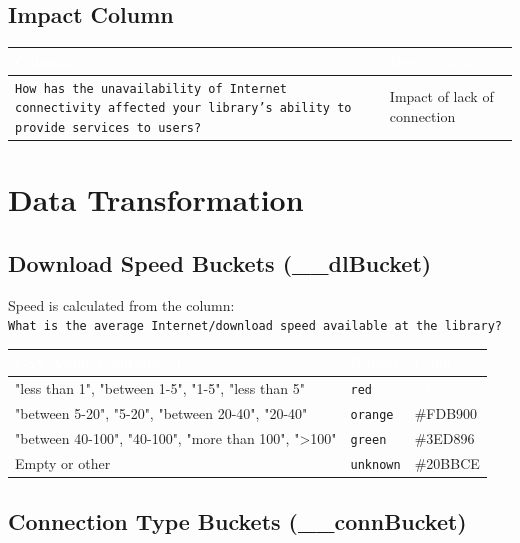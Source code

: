 \documentclass[11pt,a4paper]{article}
\begin{document}
\subsection{Impact Column}

\begin{longtable}{|p{9cm}|p{5cm}|}
\hline
\rowcolor{headerblue}\textcolor{white}{\textbf{Column}} & \textcolor{white}{\textbf{Description}} \\
\hline
\texttt{How has the unavailability of Internet connectivity affected your library's ability to provide services to users?} & Impact of lack of connection \\
\hline
\end{longtable}

\section{Data Transformation}

\subsection{Download Speed Buckets (\_\_dlBucket)}

Speed is calculated from the column:\\
\texttt{What is the average Internet/download speed available at the library?}

\begin{longtable}{|p{6cm}|p{3cm}|p{3cm}|}
\hline
\rowcolor{headerblue}\textcolor{white}{\textbf{CSV Value (contains...)}} & \textcolor{white}{\textbf{Bucket}} & \textcolor{white}{\textbf{Color}} \\
\hline
"less than 1", "between 1-5", "1-5", "less than 5" & \texttt{red} & \cellcolor{red-bucket}\textcolor{white}{\#F82055} \\
\hline
"between 5-20", "5-20", "between 20-40", "20-40" & \texttt{orange} & \cellcolor{orange-bucket}\#FDB900 \\
\hline
"between 40-100", "40-100", "more than 100", ">100" & \texttt{green} & \cellcolor{green-bucket}\#3ED896 \\
\hline
Empty or other & \texttt{unknown} & \cellcolor{cyan-bucket}\#20BBCE \\
\hline
\end{longtable}

\subsection{Connection Type Buckets (\_\_connBucket)}
\end{document}
